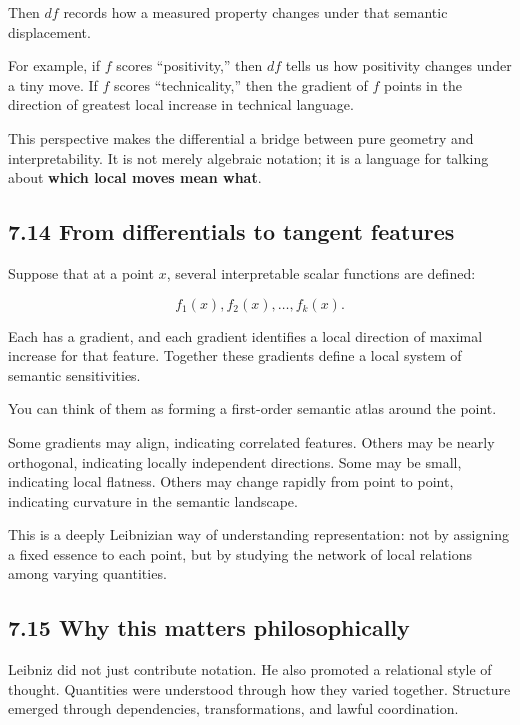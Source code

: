 Then \(df\) records how a measured property changes under that semantic
displacement.

For example, if \(f\) scores ``positivity,'' then \(df\) tells us how
positivity changes under a tiny move. If \(f\) scores ``technicality,''
then the gradient of \(f\) points in the direction of greatest local
increase in technical language.

This perspective makes the differential a bridge between pure geometry
and interpretability. It is not merely algebraic notation; it is a
language for talking about \textbf{which local moves mean what}.

\hypertarget{from-differentials-to-tangent-features}{%
\subsection{7.14 From differentials to tangent
features}\label{from-differentials-to-tangent-features}}

Suppose that at a point \(x\), several interpretable scalar functions
are defined:

\[ 
f_1(x), f_2(x), \dots, f_k(x).
\]

Each has a gradient, and each gradient identifies a local direction of
maximal increase for that feature. Together these gradients define a
local system of semantic sensitivities.

You can think of them as forming a first-order semantic atlas around the
point.

Some gradients may align, indicating correlated features. Others may be
nearly orthogonal, indicating locally independent directions. Some may
be small, indicating local flatness. Others may change rapidly from
point to point, indicating curvature in the semantic landscape.

This is a deeply Leibnizian way of understanding representation: not by
assigning a fixed essence to each point, but by studying the network of
local relations among varying quantities.

\hypertarget{why-this-matters-philosophically}{%
\subsection{7.15 Why this matters
philosophically}\label{why-this-matters-philosophically}}

Leibniz did not just contribute notation. He also promoted a relational
style of thought. Quantities were understood through how they varied
together. Structure emerged through dependencies, transformations, and
lawful coordination.


